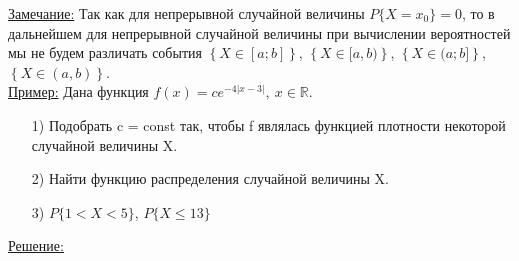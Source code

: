 \underline{Замечание:} Так как для непрерывной случайной величины $P\{X = x_0\} = 0$, то в дальнейшем для непрерывной случайной величины при вычислении вероятностей мы не будем различать события $\left\{ X \in [a;b] \right\}$, $\left\{ X \in [a,b) \right\}$, $\left\{ X \in (a;b] \right\}$, $\left\{ X \in (a,b) \right\}$. \\


\underline{Пример:} Дана функция $f(x) = ce^{-4|x-3|}, \ x \in \mathbb{R}$. 
\begin{enumerate}
\item[1)] Подобрать c = const так, чтобы f являлась функцией плотности некоторой случайной величины X.
\item[2)] Найти функцию распределения случайной величины X.
\item[3)] $P\{1 < X < 5\}$,  $P\{X \leqslant 13\}$
\end{enumerate}
\underline{Решение:}
